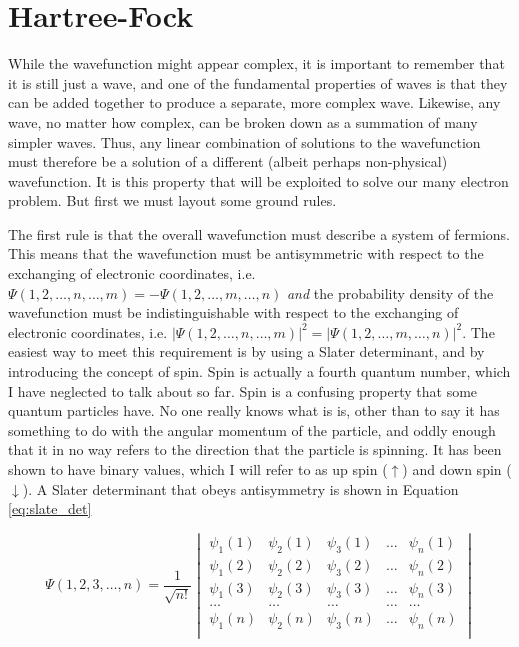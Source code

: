 \documentclass[12pt]{report}
\begin{document}
\section{Hartree-Fock}
\label{sec:hartree_fock}
While the wavefunction might appear complex, it is important to remember that it is still just a wave, and one of the fundamental properties of waves is that they can be added together to produce a separate, more complex wave. Likewise, any wave, no matter how complex, can be broken down as a summation of many simpler waves\cite{fourier1822thorie}. Thus, any linear combination of solutions to the wavefunction must therefore be a solution of a different (albeit perhaps non-physical) wavefunction. It is this property that will be exploited to solve our many electron problem. But first we must layout some ground rules.

The first rule is that the overall wavefunction must describe a system of fermions. This means that the wavefunction must be antisymmetric with respect to the exchanging of electronic coordinates, i.e. $\Psi(1, 2,\ldots, n,\ldots,m) = -\Psi(1, 2,\ldots, m,\ldots,n)$ \textit{and} the probability density of the wavefunction must be indistinguishable with respect to the exchanging of electronic coordinates, i.e. $|\Psi(1, 2,\ldots, n,\ldots,m)|^{2} = |\Psi(1, 2,\ldots, m,\ldots,n)|^{2}$. The easiest way to meet this requirement is by using a Slater determinant\cite{PhysRev.34.1293}, and by introducing the concept of spin. Spin is actually a fourth quantum number, which I have neglected to talk about so far. Spin is a confusing property that some quantum particles have. No one really knows what is is, other than to say it has something to do with the angular momentum of the particle, and oddly enough that it in no way refers to the direction that the particle is spinning. It has been shown to have binary values\cite{Gerlach1922}, which I will refer to as up spin ($\uparrow$) and down spin ($\downarrow$). A Slater determinant that obeys antisymmetry is shown in Equation \ref{eq:slate_det}

\begin{equation}
\label{eq:slate_det}
\Psi(1, 2, 3, \ldots, n) =
\frac{1}{\sqrt{n!}}
\begin{vmatrix}
\psi_{1}(1)		&	\psi_{2}(1)		&	\psi_{3}(1)		&	\ldots	&	\psi_{n}(1)		\\
\psi_{1}(2)		&	\psi_{2}(2)		&	\psi_{3}(2)		&	\ldots	&	\psi_{n}(2)		\\
\psi_{1}(3)		&	\psi_{2}(3)		&	\psi_{3}(3)		&	\ldots	&	\psi_{n}(3)		\\
\ldots		&	\ldots		&	\ldots		&	\ldots	&	\ldots		\\
\psi_{1}(n)		&	\psi_{2}(n)		&	\psi_{3}(n)		&	\ldots	&	\psi_{n}(n)		\\

\end{vmatrix}
\end{equation} 
\end{document}
